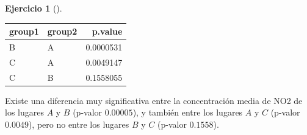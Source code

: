 \documentclass[
  a4paper,
]{scrreport}
\theoremstyle{definition}
\newtheorem{exercise}{Ejercicio}[chapter]
\theoremstyle{remark}
\begin{document}
\begin{exercise}[]
\begin{enumerate}
\begin{tcolorbox}
  \begin{longtable}[]{@{}llr@{}}
  \toprule\noalign{}
  group1 & group2 & p.value \\
  \midrule\noalign{}
  \endhead
  \bottomrule\noalign{}
  \endlastfoot
  B & A & 0.0000531 \\
  C & A & 0.0049147 \\
  C & B & 0.1558055 \\
  \end{longtable}

  Existe una diferencia muy significativa entre la concentración media
  de NO2 de los lugares \(A\) y \(B\) (p-valor \(0.00005\)), y también
  entre los lugares \(A\) y \(C\) (p-valor \(0.0049\)), pero no entre
  los lugares \(B\) y \(C\) (p-valor \(0.1558\)).

  \end{tcolorbox}
\end{enumerate}

\end{exercise}
\end{document}
